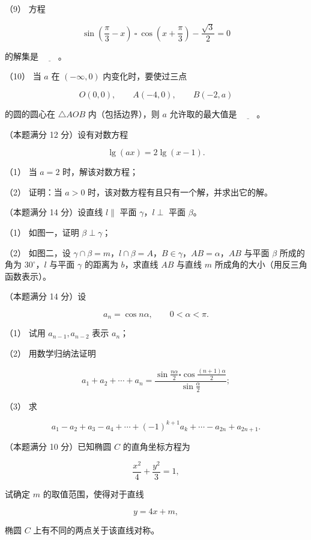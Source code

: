 \begin{question}
（9） 方程

\nopagebreak[4]
\[
\sin\left(\frac\pi3-x\right)\ \square\
\cos\left(x+\frac\pi3\right)-\frac{\sqrt3}{2}=0
\]

的解集是 $\underline{\hspace{2em}}$。

（10） 当 $a$ 在 $(-\infty,0)$ 内变化时，要使过三点

\nopagebreak[4]
\[
O(0,0),\qquad A(-4,0),\qquad B(-2,a)
\]

的圆的圆心在 $\triangle AOB$ 内（包括边界），则 $a$ 允许取的最大值是 $\underline{\hspace{2em}}$。

\end{question}
\begin{question}
（本题满分 12 分）设有对数方程

\nopagebreak[4]
\[
\lg(ax)=2\lg(x-1).
\]

（1） 当 $a=2$ 时，解该对数方程；

（2） 证明：当 $a>0$ 时，该对数方程有且只有一个解，并求出它的解。

\Needspace{0.4\textheight}
\end{question}
\begin{question}
（本题满分 14 分）设直线 $l\parallel$ 平面 $\gamma$，$l\perp$ 平面 $\beta$。

（1） 如图一，证明 $\beta\perp\gamma$；

（2） 如图二，设 $\gamma\cap\beta=m$，$l\cap\beta=A$，$B\in\gamma$，$AB=\alpha$，$AB$ 与平面 $\beta$ 所成的角为 $30^\circ$，$l$ 与平面 $\gamma$ 的距离为 $b$，求直线 $AB$ 与直线 $m$ 所成角的大小（用反三角函数表示）。
\nopagebreak[4]
\begin{center}\end{center}
\nopagebreak[4]
\Needspace{0.4\textheight}

\end{question}
\begin{question}
（本题满分 14 分）设

\nopagebreak[4]
\[
a_n=\cos n\alpha,\qquad 0<\alpha<\pi.
\]

（1） 试用 $a_{n-1},a_{n-2}$ 表示 $a_n$；

\Needspace{5\baselineskip}
（2） 用数学归纳法证明

\nopagebreak[4]
\[
a_1+a_2+\cdots+a_n
=\frac{\sin\frac{n\alpha}{2}\square\cos\frac{(n+1)\alpha}{2}}
{\sin\frac\alpha2};
\]

\Needspace{5\baselineskip}
（3） 求

\nopagebreak[4]
\[
a_1-a_2+a_3-a_4+\cdots+(-1)^{k+1}a_k+\cdots-a_{2n}+a_{2n+1}.
\]

\end{question}
\begin{question}
（本题满分 10 分）已知椭圆 $C$ 的直角坐标方程为

\nopagebreak[4]
\[
\frac{x^2}{4}+\frac{y^2}{3}=1,
\]

试确定 $m$ 的取值范围，使得对于直线

\nopagebreak[4]
\[
y=4x+m,
\]

椭圆 $C$ 上有不同的两点关于该直线对称。

\end{question}